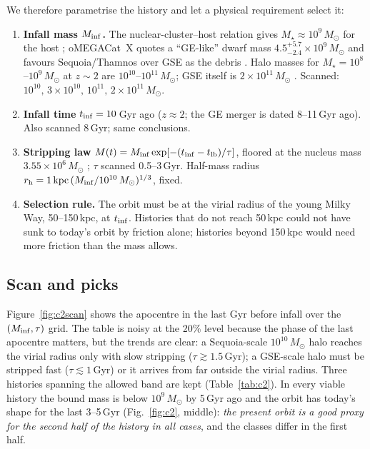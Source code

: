 \documentclass[11pt,a4paper]{article}
\newcommand{\Msun}{M_\odot}
\begin{document}
We therefore parametrise the history and let a physical requirement select it:
\begin{enumerate}
\item \textbf{Infall mass $M_{\rm inf}$.} The nuclear-cluster--host relation gives
  $M_\star\approx10^9\,\Msun$ for the host \citep{pfeffer2021}; oMEGACat~X quotes a
  ``GE-like'' dwarf mass $4.5^{+5.7}_{-2.4}\times10^9\,\Msun$ and favours Sequoia/Thamnos over
  GSE as the debris \citep{souza2026}. Halo masses for $M_\star=10^8$--$10^9\,\Msun$ at
  $z\sim2$ are $10^{10}$--$10^{11}\,\Msun$; GSE itself is $2\times10^{11}\,\Msun$
  \citep{naidu2021}. Scanned: $10^{10},\,3\times10^{10},\,10^{11},\,2\times10^{11}\,\Msun$.
\item \textbf{Infall time} $t_{\rm inf}=10$\,Gyr ago ($z\approx2$; the GE merger is dated
  8--11\,Gyr ago). Also scanned 8\,Gyr; same conclusions.
\item \textbf{Stripping law} $M(t)=M_{\rm inf}\exp[-(t_{\rm inf}-t_{\rm lb})/\tau]$, floored
  at the nucleus mass $3.55\times10^6\,\Msun$ \citep{baumgardt2018}; $\tau$ scanned
  0.5--3\,Gyr. Half-mass radius $r_{\rm h}=1\,{\rm kpc}\,(M_{\rm inf}/10^{10}\,\Msun)^{1/3}$,
  fixed.
\item \textbf{Selection rule.} The orbit must be at the virial radius of the young Milky Way,
  50--150\,kpc, at $t_{\rm inf}$. Histories that do not reach 50\,kpc could not have sunk to
  today's orbit by friction alone; histories beyond 150\,kpc would need more friction than the
  mass allows.
\end{enumerate}

\subsection{Scan and picks}
Figure~\ref{fig:c2scan} shows the apocentre in the last Gyr before infall over the
$(M_{\rm inf},\tau)$ grid. The table is noisy at the 20\% level because the phase of the last
apocentre matters, but the trends are clear: a Sequoia-scale $10^{10}\,\Msun$ halo reaches the
virial radius only with slow stripping ($\tau\gtrsim1.5$\,Gyr); a GSE-scale halo must be
stripped fast ($\tau\lesssim1$\,Gyr) or it arrives from far outside the virial radius. Three
histories spanning the allowed band are kept (Table~\ref{tab:c2}). In every viable history the
bound mass is below $10^9\,\Msun$ by 5\,Gyr ago and the orbit has today's shape for the last
3--5\,Gyr (Fig.~\ref{fig:c2}, middle): \emph{the present orbit is a good proxy for the second
half of the history in all cases}, and the classes differ in the first half.
\end{document}
